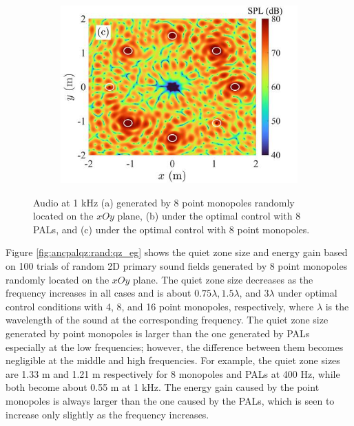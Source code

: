 \begin{figure}[!htb]
\begin{subfigure}{0.32\textwidth}
        \includegraphics[width = \textwidth]{fig/cal_ANC_QuietZone_demo_tot_Monopole_200503C_resize.jpg}
    \end{subfigure}
    \caption{Audio  at 1 kHz (a) generated by 8 point monopoles randomly located on the $xOy$ plane, (b) under the optimal control with 8 PALs, and (c) under the optimal control with 8 point monopoles.}
    \label{fig:ancpalqz:2d:rand:compare}
\end{figure}

Figure \ref{fig:ancpalqz:rand:qz_eg} shows the quiet zone size and energy gain based on 100 trials of random 2D primary sound fields generated by 8 point monopoles randomly located on the $xOy$ plane. 
The quiet zone size decreases as the frequency increases in all cases and is about $0.75\lambda, 1.5\lambda$, and $3\lambda$ under optimal control conditions with 4, 8, and 16 point monopoles, respectively, 
where $\lambda$ is the wavelength of the sound at the corresponding frequency. 
The quiet zone size generated by point monopoles is larger than the one generated by PALs especially at the low frequencies; however, the difference between them becomes negligible at the middle and high frequencies. 
For example, the quiet zone sizes are 1.33 m and 1.21 m respectively for 8 monopoles and PALs at 400 Hz, while both become about 0.55 m at 1 kHz. 
The energy gain caused by the point monopoles is always larger than the one caused by the PALs, which is seen to increase only slightly as the frequency increases.

